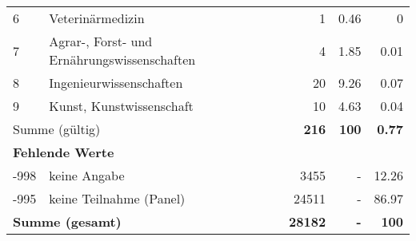 \begin{longtable}{lXrrr}
     6 &
     \multicolumn{1}{X}{ Veterinärmedizin   } &


       \num{1} &
       \num[round-mode=places,round-precision=2]{0,46} &
         \num[round-mode=places,round-precision=2]{0} \\

     7 &
     \multicolumn{1}{X}{ Agrar-, Forst- und Ernährungswissenschaften   } &


       \num{4} &
       \num[round-mode=places,round-precision=2]{1,85} &
         \num[round-mode=places,round-precision=2]{0,01} \\

     8 &
     \multicolumn{1}{X}{ Ingenieurwissenschaften   } &


       \num{20} &
       \num[round-mode=places,round-precision=2]{9,26} &
         \num[round-mode=places,round-precision=2]{0,07} \\

     9 &
     \multicolumn{1}{X}{ Kunst, Kunstwissenschaft   } &


       \num{10} &
       \num[round-mode=places,round-precision=2]{4,63} &
         \num[round-mode=places,round-precision=2]{0,04} \\
     \midrule
     \multicolumn{2}{l}{Summe (gültig)} &
       \textbf{\num{216}} &
     \textbf{100} &
       \textbf{\num[round-mode=places,round-precision=2]{0,77}} \\
     \multicolumn{5}{l}{\textbf{Fehlende Werte}}\\
       -998 &
       keine Angabe &
         \num{3455} &
        - &
         \num[round-mode=places,round-precision=2]{12,26} \\
       -995 &
       keine Teilnahme (Panel) &
         \num{24511} &
        - &
         \num[round-mode=places,round-precision=2]{86,97} \\
     \midrule
     \multicolumn{2}{l}{\textbf{Summe (gesamt)}} &
          \textbf{\num{28182}} &
        \textbf{-} &
        \textbf{100} \\
     \bottomrule
     \end{longtable}
     
